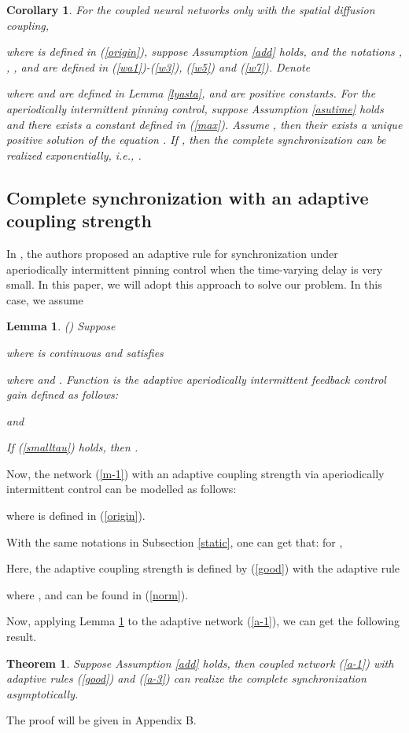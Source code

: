 \documentclass[review]{elsarticle}
\newtheorem{thm}{Theorem}
\newtheorem{lem}{Lemma}
\newtheorem{col}{Corollary}
\begin{document}
\begin{col}
For the coupled neural networks only with the spatial diffusion coupling,

where  is defined in (\ref{origin}), suppose Assumption \ref{add} holds, and the notations , , ,  and  are defined in (\ref{wa1})-(\ref{w3}), (\ref{w5}) and (\ref{w7}). Denote

where  and  are defined in Lemma \ref{lyasta},  and  are positive constants. For the aperiodically intermittent pinning control, suppose Assumption \ref{asutime} holds and there exists a constant  defined in (\ref{max}). Assume , then their exists a unique positive solution  of the equation
.
If , then the complete synchronization can be realized exponentially, i.e., .
\end{col}

\subsection{Complete synchronization with an adaptive coupling strength}\label{adaptive}
In \cite{LC15}, the authors proposed an adaptive rule for synchronization under aperiodically intermittent pinning control when the time-varying delay is very small. In this paper, we will adopt this approach to solve our problem. In this case, we assume


\begin{lem}\label{ht}
(\cite{LC15}) Suppose

where  is continuous and satisfies

where  and . Function  is the adaptive aperiodically intermittent feedback control gain defined as follows:

and

If (\ref{smalltau}) holds, then .
\end{lem}

Now, the network (\ref{m-1}) with an adaptive coupling strength via aperiodically intermittent control can be modelled as follows:

where  is defined in (\ref{origin}).

With the same notations in Subsection \ref{static}, one can get that: for ,


Here, the adaptive coupling strength  is defined by (\ref{good}) with the adaptive rule

where , and  can be found in (\ref{norm}).

Now, applying Lemma \ref{ht} to the adaptive network (\ref{a-1}), we can get the following result.
\begin{thm}\label{thm2}
Suppose Assumption \ref{add} holds, then coupled network (\ref{a-1}) with adaptive rules (\ref{good}) and (\ref{a-3}) can realize the complete synchronization asymptotically.
\end{thm}
The proof will be given in Appendix B.
\end{document}
